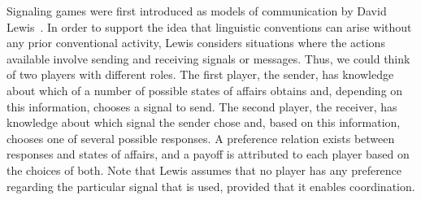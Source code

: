 \documentclass[a4paper]{article}
\begin{document}
Signaling games were first introduced as models of communication by David Lewis~\parencite*{lewis_convention_1969}.
In order to support the idea that linguistic conventions can arise without any prior conventional activity, Lewis considers situations where the actions available involve sending and receiving signals or messages.
Thus, we could think of two players with different roles.
The first player, the sender, has knowledge about which of a number of possible states of affairs obtains and, depending on this information, chooses a signal to send.
The second player, the receiver, has knowledge about which signal the sender chose and, based on this information, chooses one of several possible responses.
A preference relation exists between responses and states of affairs, and a payoff is attributed to each player based on the choices of both.
Note that Lewis assumes that no player has any preference regarding the particular signal that is used, provided that it enables coordination.
\end{document}
